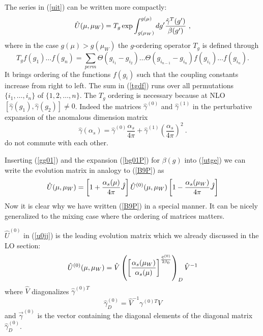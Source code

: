 \documentclass[12pt]{article}
\def\as{\alpha_s}
\newcommand{\eqn}{\ref}
\def\aspi{\frac{\as}{4\pi}}
\begin{document}
\begin{itemize}
\begin{itemize}
\begin{itemize}
The series in (\ref{uit}) can be written more compactly:
\begin{equation}\label{utge}
\hat U(\mu, \mu_W)=
T_g \exp\int^{g(\mu)}_{g(\mu_W)}dg'{\hat\gamma^T(g')\over\beta(g')}~,
\end{equation}
where in the case $g(\mu)>g(\mu_W)$ the $g$-ordering operator $T_g$ is
defined through
\begin{equation}\label{tgdf}
T_g f(g_1)\ldots f(g_n)=\sum_{perm}
\Theta(g_{i_1}-g_{i_2})\ldots
\Theta(g_{i_{n-1}}-g_{i_n})f(g_{i_1})\ldots f(g_{i_n}). \end{equation}
It brings ordering of the functions $f(g_i)$ such that the
coupling constants increase from right to left. The sum in (\eqn{tgdf}) runs
over all permutations $\{i_1,\ldots, i_n\}$ of $\{1, 2,\ldots, n\}$.
The $T_g$ ordering is necessary because at NLO
$[\hat\gamma(g_1), \hat\gamma(g_2)]\not= 0$. Indeed the matrices
$\hat\gamma^{(0)}$ and $\hat\gamma^{(1)}$ in the perturbative expansion
of the anomalous dimension matrix
\begin{equation}\label{gg01}
\hat\gamma(\as)=\hat\gamma^{(0)}\aspi + \hat\gamma^{(1)}\left(\aspi\right)^2~.
\end{equation}
do not commute with each other.

Inserting (\ref{gg01}) and the expansion (\ref{bg01P}) for $\beta(g)$
into (\ref{utge}) we can write the evolution matrix in analogy to
(\ref{B9P}) as
\begin{equation}\label{u0jj}
\hat U(\mu,\mu_W)=
\left[1+{\as(\mu)\over 4\pi} \hat J\right] \hat U^{(0)}(\mu,\mu_W) 
\left[1-{\as(\mu_W)\over 4\pi} \hat J\right]
\end{equation}
Now it is clear why we have written (\ref{B9P}) in a special manner.
It can be nicely generalized to the mixing case where the ordering
of matrices matters.

$\hat U^{(0)}$ in (\ref{u0jj}) is the leading evolution matrix which
we already discussed in the LO section:
\begin{equation}\label{u0vdP} 
\hat U^{(0)}(\mu,\mu_W)= \hat V
\left(
{\left[{\as(\mu_W)\over\as(\mu)}\right]}^{{\vec\gamma^{(0)}\over 2\beta_0}}
   \right)_D \hat V^{-1}   \end{equation}
where $\hat V$ diagonalizes ${\hat\gamma^{(0)T}}$
\begin{equation}\label{ga0dP} \hat\gamma^{(0)}_D=\hat V^{-1} {\gamma^{(0)T}} 
\hat V
\end{equation}
and $\vec\gamma^{(0)}$ is the vector containing the diagonal elements of
the diagonal matrix $\hat\gamma^{(0)}_D$.


\end{itemize}
\end{itemize}
\end{itemize}
\end{document}
